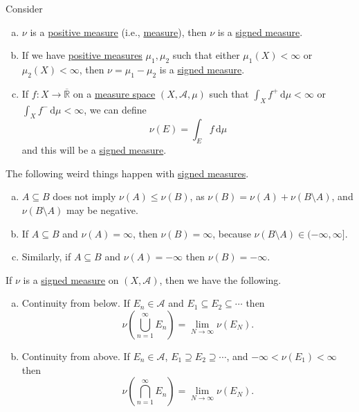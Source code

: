 \begin{eg}
	Consider
	\begin{enumerate}[(a)]
		\item \(\nu\) is a \hyperref[def:signed-measure]{positive measure} (i.e., \hyperref[def:measure]{measure}), then \(\nu\) is a \hyperref[def:signed-measure]{signed measure}.
		\item If we have \hyperref[def:signed-measure]{positive measures} \(\mu_1,\mu_2\) such that either \(\mu_1(X) < \infty\) or \(\mu_2(X) < \infty\), then \(\nu = \mu_1 - \mu_2\) is a \hyperref[def:signed-measure]{signed measure}.
		\item If \(f \colon X \to \overline{\mathbb{R}}\) on a \hyperref[def:measure-space]{measure space} \((X,\mathcal{A},\mu)\) such that \(\int_X f^+ \,\mathrm{d} \mu < \infty\) or \(\int_X f^- \,\mathrm{d} \mu < \infty\), we can define
		      \[
			      \nu(E) = \int_E f \,\mathrm{d} \mu
		      \]
		      and this will be a \hyperref[def:signed-measure]{signed measure}.
	\end{enumerate}
\end{eg}

\begin{note}
	The following weird things happen with \hyperref[def:signed-measure]{signed measures}.
	\begin{enumerate}[(a)]
		\item \(A \subseteq B\) does not imply \(\nu(A) \leq \nu(B)\), as \(\nu(B) = \nu(A) + \nu(B \setminus A)\), and \(\nu(B \setminus A)\) may be negative.
		\item If \(A \subseteq B\) and \(\nu(A) = \infty\), then \(\nu(B) = \infty\), because \(\nu(B \setminus A) \in (-\infty,\infty]\).
		\item Similarly, if \(A \subseteq B\) and \(\nu(A) = -\infty\) then \(\nu(B) = -\infty\).
	\end{enumerate}
\end{note}

\begin{lemma}\label{lemma:signed-cont-above-below}
	If \(\nu\) is a \hyperref[def:signed-measure]{signed measure} on \((X, \mathcal{A})\), then we have the following.
	\begin{enumerate}[(a)]
		\item\label{lma:signed-continuity-from-below} Continuity from below. If \(E_n \in \mathcal{A}\) and \(E_1 \subseteq E_2 \subseteq \cdots\) then
		      \[
			      \nu\left( \bigcup_{n=1}^\infty E_n \right)  = \lim_{N \to \infty} \nu(E_N).
		      \]
		\item\label{lma:signed-continuity-from-above} Continuity from above. If \(E_n \in \mathcal{A}\), \(E_1 \supseteq E_2 \supseteq \cdots\),
		      and \(-\infty < \nu(E_1) < \infty\) then
		      \[
			      \nu\left( \bigcap_{n=1}^\infty E_n \right)  = \lim_{N \to \infty} \nu(E_N).
		      \]
	\end{enumerate}
\end{lemma}

